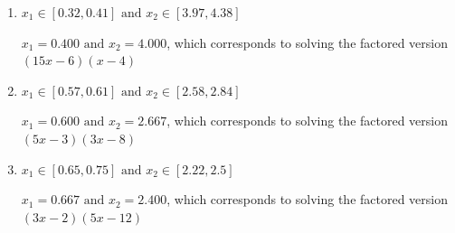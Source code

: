 \documentclass{extbook}[14pt]
\begin{document}
\begin{enumerate}
{\begin{enumerate}[label=\Alph*.]
$x_1 = 18.000 \text{ and } x_2 = 20.000$, which corresponds to solving the factored version $(x -18)(x -20)$
\item \( x_1 \in [0.32, 0.41] \text{ and } x_2 \in [3.97, 4.38] \)

$x_1 = 0.400 \text{ and } x_2 = 4.000$, which corresponds to solving the factored version $(15x -6)(x -4)$
\item \( x_1 \in [0.57, 0.61] \text{ and } x_2 \in [2.58, 2.84] \)

$x_1 = 0.600 \text{ and } x_2 = 2.667$, which corresponds to solving the factored version $(5x -3)(3x -8)$
\item \( x_1 \in [0.65, 0.75] \text{ and } x_2 \in [2.22, 2.5] \)

$x_1 = 0.667 \text{ and } x_2 = 2.400$, which corresponds to solving the factored version $(3x -2)(5x -12)$
\end{enumerate}

}
\end{enumerate}
\end{document}
